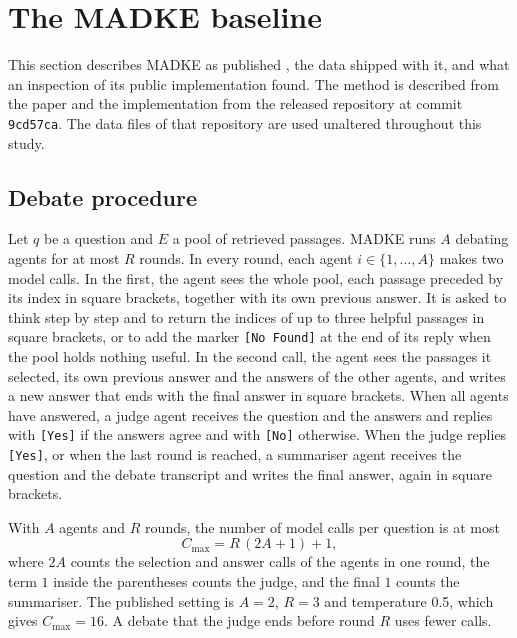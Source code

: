 \section{The MADKE baseline}
\label{sec:baseline}

This section describes MADKE as published \cite{wang2025madke}, the data shipped with it, and what an inspection of its public implementation found. The method is described from the paper and the implementation from the released repository \cite{madke2025code} at commit \texttt{9cd57ca}. The data files of that repository are used unaltered throughout this study.

\subsection{Debate procedure}
Let $q$ be a question and $E$ a pool of retrieved passages. MADKE runs $A$ debating agents for at most $R$ rounds. In every round, each agent $i \in \{1,\dots,A\}$ makes two model calls. In the first, the agent sees the whole pool, each passage preceded by its index in square brackets, together with its own previous answer. It is asked to think step by step and to return the indices of up to three helpful passages in square brackets, or to add the marker \texttt{[No Found]} at the end of its reply when the pool holds nothing useful. In the second call, the agent sees the passages it selected, its own previous answer and the answers of the other agents, and writes a new answer that ends with the final answer in square brackets. When all agents have answered, a judge agent receives the question and the answers and replies with \texttt{[Yes]} if the answers agree and with \texttt{[No]} otherwise. When the judge replies \texttt{[Yes]}, or when the last round is reached, a summariser agent receives the question and the debate transcript and writes the final answer, again in square brackets.

With $A$ agents and $R$ rounds, the number of model calls per question is at most
\begin{equation}
C_{\max} = R\,(2A + 1) + 1,
\label{eq:calls}
\end{equation}
where $2A$ counts the selection and answer calls of the agents in one round, the term $1$ inside the parentheses counts the judge, and the final $1$ counts the summariser. The published setting is $A{=}2$, $R{=}3$ and temperature 0.5, which gives $C_{\max} = 16$. A debate that the judge ends before round $R$ uses fewer calls.

